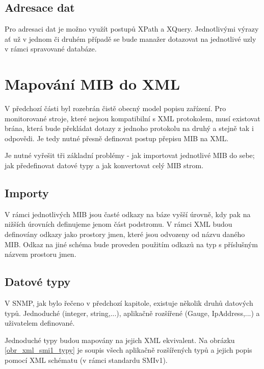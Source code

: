 \subsection{Adresace dat}
Pro adresaci dat je možno využít postupů XPath a XQuery. Jednotlivými výrazy ať už v jednom či druhém případě se bude manažer dotazovat na jednotlivé uzly v
rámci spravované databáze.


\section{Mapování MIB do XML}
V předchozí části byl rozebrán čistě obecný model popisu zařízení. Pro monitorované stroje, které nejsou kompatibilní s XML protokolem, musí existovat brána,
která bude překládat dotazy z jednoho protokolu na druhý a stejně tak i odpovědi. Je tedy nutné přesně definovat postup přepisu MIB na XML.

Je nutné vyřešit tři základní problémy - jak importovat jednotlivé MIB do sebe; jak předefinovat datové typy a jak konvertovat celý MIB strom.

\subsection{Importy}
V rámci jednotlivých MIB jsou časté odkazy na báze vyšší úrovně, kdy pak na nižších úrovních definujeme jenom část podstromu. V rámci XML budou definovány 
odkazy jako prostory jmen, které jsou odvozeny od názvu daného MIB. Odkaz na jiné schéma bude proveden použitím odkazů na typ s příslušným názvem prostoru jmen. 

\subsection{Datové typy}
V SNMP, jak bylo řečeno v předchozí kapitole, existuje několik druhů datových typů. Jednoduché (integer, string,...), aplikačně rozšířené (Gauge, IpAddress,...) a 
uživatelem definované.

Jednoduché typy budou mapovány na jejich XML ekvivalent. Na obrázku \ref{obr_xml_smi1_typy} je soupis všech aplikačně rozšířených typů a jejich popis
pomocí XML schématu (v rámci standardu SMIv1).

